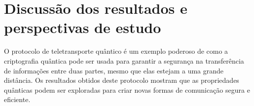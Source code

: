 \clearpage

\chapter{Discussão dos resultados e perspectivas de estudo}\label{sec:resultados}












O protocolo de teletransporte quântico é um exemplo poderoso de como a criptografia quântica pode ser usada para garantir a segurança na transferência de informações entre duas partes, mesmo que elas estejam a uma grande distância. Os resultados obtidos deste protocolo mostram que as propriedades quânticas podem ser exploradas para criar novas formas de comunicação segura e eficiente.